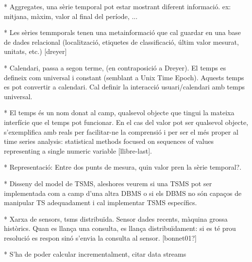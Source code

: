 * Aggregates, una sèrie temporal pot estar mostrant diferent informació. ex: mitjana, màxim, valor al final del període, ...

* Les sèries temmporals tenen una metainformació que cal guardar en una base de dades relacional (localització, etiquetes de classificació, últim valor mesurat, unitats, etc.) [dreyer]



* Calendari, passa a segon terme, (en contraposició a Dreyer). El temps es defineix com universal i constant (semblant a Unix Time Epoch). Aquests temps es pot convertir a calendari. Cal definir la interacció usuari/calendari amb temps universal.

* El temps és un nom donat al camp, qualsevol objecte que tingui la mateixa interfície que el temps pot funcionar. En el cas del valor pot ser qualsevol objecte, s'exemplifica amb reals per facilitar-ne la comprensió i per ser el més proper al time series analysis: statistical methods focused on sequences of values representing a single numeric variable [llibre-last].




* Representació: Entre dos punts de mesura, quin valor pren la sèrie temporal?.


* Disseny del model de TSMS, aleshores veurem si una TSMS pot ser implementada com a camp d'una altra DBMS o si els DBMS no són capaços de manipular TS adequadament i cal implementar TSMS específics.

* Xarxa de sensors, tsms distribuïda. Sensor dades recents, màquina grossa històrics. Quan es llança una consulta, es llança distribuïdament: si es té prou resolució es respon sinó s'envia la consulta al sensor. [bonnet01?]

* S'ha de poder calcular incrementalment, citar data streams







